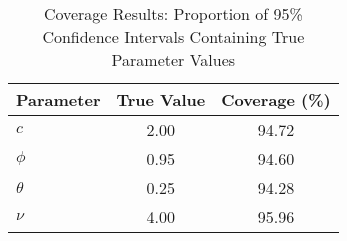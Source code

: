 \documentclass[a4paper,12pt]{article}
\begin{document}
\begin{table}[h!]
\centering
\caption{Coverage Results: Proportion of 95\% Confidence Intervals Containing True Parameter Values}
\label{tab:coverage_results}
\begin{tabular}{@{}lcc@{}}
\toprule
\textbf{Parameter} & \textbf{True Value} & \textbf{Coverage (\%)} \\ \midrule
$c$      & 2.00  & 94.72  \\
$\phi$   & 0.95  & 94.60  \\
$\theta$ & 0.25  & 94.28  \\
$\nu$    & 4.00  & 95.96  \\ \bottomrule
\end{tabular}
\end{table}
\end{document}
